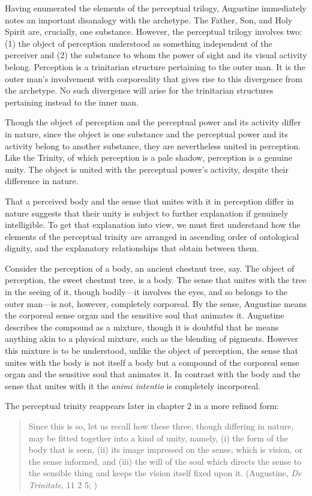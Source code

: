 \documentclass[12pt]{article}
\begin{document}
Having enumerated the elements of the perceptual trilogy, Augustine immediately notes an important disanalogy with the archetype. The Father, Son, and Holy Spirit are, crucially, one substance. However, the perceptual trilogy involves two: (1) the object of perception understood as something independent of the perceiver and (2) the substance to whom the power of sight and its visual activity belong. Perception is a trinitarian structure pertaining to the outer man. It is the outer man's involvement with corporeality that gives rise to this divergence from the archetype. No such divergence will arise for the trinitarian structures pertaining instead to the inner man.

Though the object of perception and the perceptual power and its activity differ in nature, since the object is one substance and the perceptual power and its activity belong to another substance, they are nevertheless united in perception. Like the Trinity, of which perception is a pale shadow, perception is a genuine unity. The object is united with the perceptual power's activity, despite their difference in nature. 

That a perceived body and the sense that unites with it in perception differ in nature suggests that their unity is subject to further explanation if genuinely intelligible. To get that explanation into view, we must first understand how the elements of the perceptual trinity are arranged in ascending order of ontological dignity, and the explanatory relationships that obtain between them.

Consider the perception of a body, an ancient chestnut tree, say. The object of perception, the sweet chestnut tree, is a body. The sense that unites with the tree in the seeing of it, though bodily---it involves the eyes, and so belongs to the outer man---is not, however, completely corporeal. By the sense, Augustine means the corporeal sense organ and the sensitive soul that animates it. Augustine describes the compound as a mixture, though it is doubtful that he means anything akin to a physical mixture, such as the blending of pigments. However this mixture is to be understood, unlike the object of perception, the sense that unites with the body is not itself a body but a compound of the corporeal sense organ and the sensitive soul that animates it. In contrast with the body and the sense that unites with it the \emph{animi intentio} is completely incorporeal.

The perceptual trinity reappears later in chapter 2 in a more refined form:
\begin{quote}
	Since this is so, let us recall how these three, though differing in nature, may be fitted together into a kind of unity, namely, (i) the form of the body that is seen, (ii) its image impressed on the sense, which is vision, or the sense informed, and (iii) the will of the soul which directs the sense to the sensible thing and keeps the vision itself fixed upon it. (Augustine, \emph{De Trinitate}, 11 2 5; \citealt[65]{Matthews:2002ly})
\end{quote}





\end{document}
